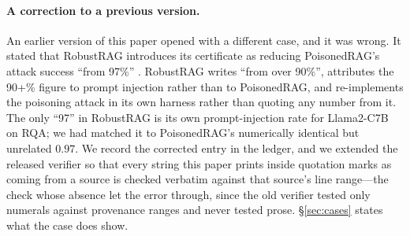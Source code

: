 \documentclass[11pt]{article}
\begin{document}
\paragraph{A correction to a previous version.}
An earlier version of this paper opened with a different case, and it was
wrong. It stated that RobustRAG introduces its certificate as reducing
PoisonedRAG's attack success ``from 97\%'' \citep{certifiedRAG2024}. RobustRAG
writes ``from over 90\%'', attributes the 90+\% figure to prompt injection
rather than to PoisonedRAG, and re-implements the poisoning attack in its own
harness rather than quoting any number from it. The only ``97'' in RobustRAG is
its own prompt-injection rate for Llama2-C7B on RQA; we had matched it to
PoisonedRAG's numerically identical but unrelated $0.97$. We record the
corrected entry in the ledger, and we extended the released verifier so that
every string this paper prints inside quotation marks as coming from a source
is checked verbatim against that source's line range---the check whose absence
let the error through, since the old verifier tested only numerals against
provenance ranges and never tested prose. \S\ref{sec:cases} states what the
case does show.
\end{document}
